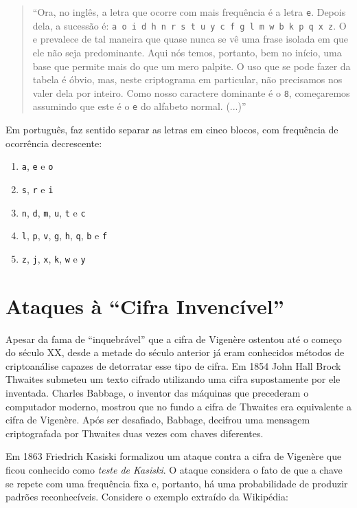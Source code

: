 \begin{quote}
``Ora, no inglês, a letra que ocorre com mais frequência é a letra {\tt e}. 
Depois dela, a sucessão é: {\tt a o i d h n r s t u y c f g l m w b k p q x z}. 
O e prevalece de tal maneira que quase nunca se vê uma frase isolada em que ele não seja predominante. 
Aqui nós temos, portanto, bem no início, uma base que permite mais do que um mero palpite. 
O uso que se pode fazer da tabela é óbvio, mas, neste criptograma em particular, não precisamos nos valer dela por inteiro. 
Como nosso caractere dominante é o {\tt 8}, começaremos assumindo que este é o {\tt e} do alfabeto normal. (...)''
\end{quote}

Em português, faz sentido separar as letras em cinco blocos, com frequência de ocorrência decrescente:
\begin{enumerate}
\item {\tt a}, {\tt e} e {\tt o}
\item {\tt s}, {\tt r} e {\tt i}
\item {\tt n}, {\tt d}, {\tt m}, {\tt u}, {\tt t} e {\tt c}
\item {\tt l}, {\tt p}, {\tt v}, {\tt g}, {\tt h}, {\tt q}, {\tt b} e {\tt f}
\item {\tt z}, {\tt j}, {\tt x}, {\tt k}, {\tt w} e {\tt y}
\end{enumerate}

\section{Ataques à ``Cifra Invencível''}
\label{sec:criptoanalise-vegenere}

Apesar da fama de ``inquebrável'' que a cifra de Vigenère ostentou até o começo do século XX, desde a metade do século anterior já eram conhecidos métodos de criptoanálise capazes de detorratar esse tipo de cifra.
Em 1854 John Hall Brock Thwaites submeteu um texto cifrado utilizando uma cifra supostamente por ele inventada.
Charles Babbage, o inventor das máquinas que precederam o computador moderno, mostrou que no fundo a cifra de Thwaites era equivalente a cifra de Vigenère.
Após ser desafiado, Babbage, decifrou uma mensagem criptografada por Thwaites duas vezes com chaves diferentes.

Em 1863 Friedrich Kasiski formalizou um ataque contra a cifra de Vigenère que ficou conhecido como {\em teste de Kasiski}.
O ataque considera o fato de que a chave se repete com uma frequência fixa e, portanto, há uma probabilidade de produzir padrões reconhecíveis.
Considere o exemplo extraído da Wikipédia:

